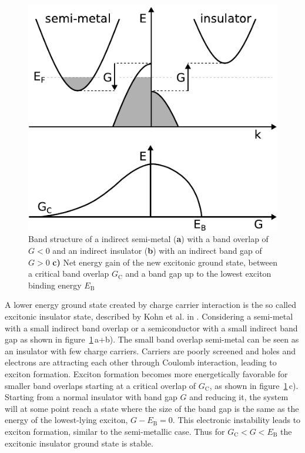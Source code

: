\begin{figure}[!t]
	\begin{minipage}{0.5\columnwidth}
		\includegraphics[width=\columnwidth]{figs/excitonic_insulator.pdf}
	\end{minipage}
	\hspace{0.04\columnwidth}
	\begin{minipage}{0.45\columnwidth}
		\caption{Band structure of a indirect semi-metal (\textbf{a}) with a band overlap of $G<0$ and an indirect insulator (\textbf{b}) with an indirect band gap of $G>0$ \textbf{c)} Net energy gain of the new excitonic ground state, between a critical band overlap $G_\mathrm{C}$ and a band gap up to the lowest exciton binding energy $E_\mathrm{B}$}
		\label{fig:ei}
	\end{minipage}
\end{figure}

A lower energy ground state created by charge carrier interaction is the so called excitonic insulator state, described by Kohn et al. in \cite{jerome1967, kohn1967}.
Considering a semi-metal with a small indirect band overlap or a semiconductor with a small indirect band gap as shown in figure~\ref{fig:ei}\,a+b).
The small band overlap semi-metal can be seen as an insulator with few charge carriers.
Carriers are poorly screened and holes and electrons are attracting each other through Coulomb interaction, leading to exciton formation.
Exciton formation becomes more energetically favorable for smaller band overlaps starting at a critical overlap of $G_\mathrm{C}$, as shown in figure~\ref{fig:ei}\,c).
Starting from a normal insulator with band gap $G$ and reducing it, the system will at some point reach a state where the size of the band gap is the same as the energy of the lowest-lying exciton, $G-E_\mathrm{B}=0$.
This electronic instability leads to exciton formation, similar to the semi-metallic case.
Thus for $G_\mathrm{C}<G<E_\mathrm{B}$ the excitonic insulator ground state is stable.

